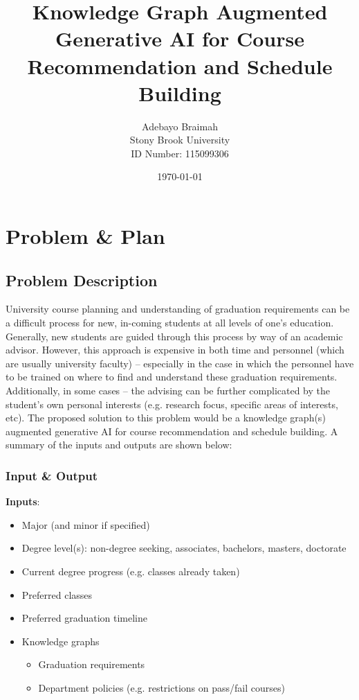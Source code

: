 \documentclass[12pt]{article}
\title{\Large \bf 
Knowledge Graph Augmented Generative AI for Course Recommendation and Schedule Building
}
\author{
{\rm Adebayo Braimah}\\
Stony Brook University \\
{\rm ID Number: 115099306}
}
\date{\today}
\begin{document}
    
    \maketitle
    
    \section{Problem \& Plan}
    \label{sec:prob_plan}
    
    \subsection{Problem Description}
    \label{subsec:problem}
    University course planning and understanding of graduation requirements can be a difficult process for new, in-coming students at all levels of one's education. Generally, new students are guided through this process by way of an academic advisor. However, this approach is expensive in both time and personnel (which are usually university faculty) -- especially in the case in which the personnel have to be trained on where to find and understand these graduation requirements. Additionally, in some cases -- the advising can be further complicated by the student's own personal interests (e.g. research focus, specific areas of interests, etc). The proposed solution to this problem would be a knowledge graph(s) augmented generative AI for course recommendation and schedule building. A summary of the inputs and outputs are shown below:

    \subsubsection{Input \& Output}
    \label{subsubsec:in-out}
    
    \textbf{Inputs}:

    \begin{itemize}
        \label{items:inputs}
        \item Major (and minor if specified)
        \item Degree level(s): non-degree seeking, associates, bachelors, masters, doctorate
        \item Current degree progress (e.g. classes already taken)
        \item Preferred classes
        \item Preferred graduation timeline
        \item Knowledge graphs
        \begin{itemize}
            \item Graduation requirements
            \item Department policies (e.g. restrictions on pass/fail courses)
        \end{itemize}
    \end{itemize}
\end{document}

